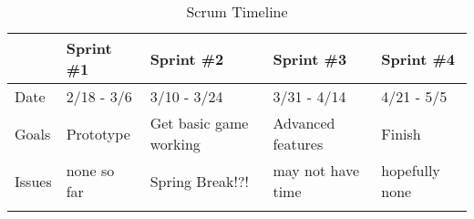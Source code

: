 \documentclass[12pt]{article}
\begin{document}
\begin{table}[h]
\centering
\begin{tabular}{|l|l|l|l|l|}
\hline
& Sprint \#1 & Sprint \#2 & Sprint \#3 & Sprint \#4 \\ \hline
Date & 2/18 - 3/6 & 3/10 - 3/24 & 3/31 - 4/14 & 4/21 - 5/5 \\ \hline
Goals & Prototype & Get basic game working & Advanced features & Finish \\ \hline
Issues & none so far & Spring Break!?! & may not have time & hopefully none \\ \hline
&  &  &  &  \\ \hline
\end{tabular}
\caption{Scrum Timeline}
\label{timeline}
\end{table}




\end{document}
